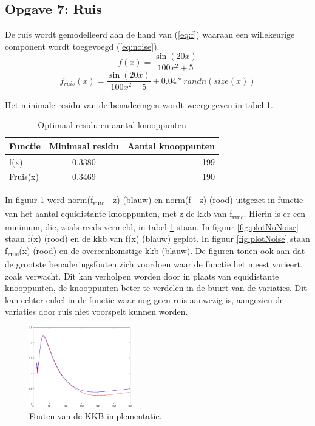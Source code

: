 \documentclass[a4paper]{article}
\newcommand{\opgave}[1]{\subsection{Opgave #1}}
\begin{document}
\opgave{7: Ruis}\label{sec:oef7}
De ruis wordt gemodelleerd aan de hand van (\ref{eq:f}) waaraan een willekeurige component wordt toegevoegd (\ref{eq:noise}).
\begin{equation}\label{eq:f}
	f(x) = \frac{\sin{(20x)}}{100x^2+5}
\end{equation}
\begin{equation}\label{eq:noise}
	f_{ruis}(x) = \frac{\sin{(20x)}}{100x^2+5} + 0.04*randn(size(x))
\end{equation}

Het minimale residu van de benaderingen wordt weergegeven in tabel \ref{tab:splineError}.
\begin{table}[H]
	\centering
	\begin{tabular}{l c r}
		Functie & Minimaal residu & Aantal knooppunten \\ \hline
		f(x) & 0.3380 & 199 \\
		Fruis(x) & 0.3469 & 190 \\
	\end{tabular}
	\caption{Optimaal residu en aantal knooppunten}
	\label{tab:splineError}
\end{table}

In figuur \ref{fig:errorkkb} werd norm(f\textsubscript{ruis} - z) (blauw) en norm(f - z) (rood) uitgezet in functie van het aantal equidistante knooppunten, met z de kkb van f\textsubscript{ruis}. Hierin is er een minimum, die, zoals reeds vermeld, in tabel \ref{tab:splineError} staan. In figuur \ref{fig:plotNoNoise} staan f(x) (rood) en de kkb van f(x) (blauw) geplot. In figuur \ref{fig:plotNoise} staan f\textsubscript{ruis}(x) (rood) en de overeenkomstige kkb (blauw). De figuren tonen ook aan dat de grootste benaderingsfouten zich voordoen waar de functie het meest varieert, zoals verwacht. Dit kan verholpen worden door in plaats van equidistante knooppunten, de knooppunten beter te verdelen in de buurt van de variaties. Dit kan echter enkel in de functie waar nog geen ruis aanwezig is, aangezien de variaties door ruis niet voorspelt kunnen worden. \\

\begin{figure}[H]
	\begin{center} 
		\includegraphics[width=0.4\textwidth]{ErrorBSplines.eps}
	\end{center}
	\caption{Fouten van de KKB implementatie.}
	\label{fig:errorkkb}
\end{figure}
\end{document}
